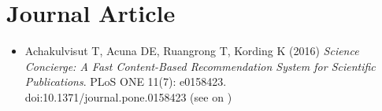\section{\sc Journal Article}

\begin{itemize}[leftmargin=0cm, label={}]

\item Achakulvisut T, Acuna DE, Ruangrong T, Kording K (2016) {\em Science Concierge: A Fast Content-Based Recommendation System for Scientific Publications}. PLoS ONE 11(7): e0158423.\\ doi:10.1371/journal.pone.0158423
(see on \href{https://github.com/titipata/science_concierge}{\faGithubAlt})

\end{itemize}
